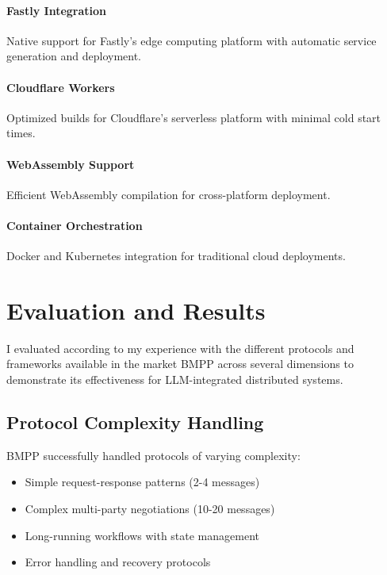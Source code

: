 \documentclass[11pt,a4paper]{article}
\begin{document}
	\paragraph{Fastly Integration} Native support for Fastly's edge computing platform with automatic service generation and deployment.
	
	\paragraph{Cloudflare Workers} Optimized builds for Cloudflare's serverless platform with minimal cold start times.
	
	\paragraph{WebAssembly Support} Efficient WebAssembly compilation for cross-platform deployment.
	
	\paragraph{Container Orchestration} Docker and Kubernetes integration for traditional cloud deployments.
	
	\section{Evaluation and Results}
	\label{sec:evaluation}
	
	I evaluated according to my experience with the different protocols and frameworks available in the market BMPP across several dimensions to demonstrate its effectiveness for LLM-integrated distributed systems.
	
	\subsection{Protocol Complexity Handling}
	\label{subsec:complexity}
	
	BMPP successfully handled protocols of varying complexity:
	\begin{itemize}
		\item Simple request-response patterns (2-4 messages)
		\item Complex multi-party negotiations (10-20 messages)
		\item Long-running workflows with state management
		\item Error handling and recovery protocols
	\end{itemize}
	
\end{document}
